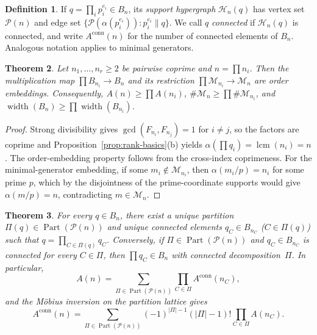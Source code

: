 \documentclass[11pt,letterpaper]{article}
\numberwithin{equation}{section}
\theoremstyle{plain}
\newtheorem{theorem}{Theorem}[section]
\theoremstyle{definition}
\newtheorem{definition}[theorem]{Definition}
\theoremstyle{remark}
\DeclareMathOperator{\lcmop}{lcm}
\DeclareMathOperator{\widthop}{width}
\begin{document}
\begin{definition}\label{def:support-hypergraph}
If $q=\prod_i p_i^{e_i}\in B_n$, its \emph{support hypergraph}
$\mathcal H_n(q)$ has vertex set $\mathcal P(n)$ and edge set
$\{\mathcal P(\alpha(p_i^{e_i})):p_i^{e_i}\parallel q\}$. We call $q$
\emph{connected} if $\mathcal H_n(q)$ is connected, and write
$A^{\mathrm{conn}}(n)$ for the number of connected elements of $B_n$.
Analogous notation applies to minimal generators.
\end{definition}

\begin{theorem}\label{thm:coprime-embedding}
Let $n_1,\dots,n_r\ge 2$ be pairwise coprime and $n=\prod n_i$. Then the
multiplication map $\prod B_{n_i}\to B_n$ and its restriction
$\prod\mathcal M_{n_i}\to\mathcal M_n$ are order embeddings. Consequently,
$A(n)\ge\prod A(n_i)$, $\#\mathcal M_n\ge\prod\#\mathcal M_{n_i}$, and
$\widthop(B_n)\ge\prod\widthop(B_{n_i})$.
\end{theorem}

\begin{proof}
Strong divisibility gives $\gcd(F_{n_i},F_{n_j})=1$ for $i\neq j$, so the
factors are coprime and Proposition~\ref{prop:rank-basics}(b) yields
$\alpha(\prod q_i)=\lcmop(n_i)=n$. The order-embedding property follows from
the cross-index coprimeness. For the minimal-generator embedding, if some
$m_i\notin\mathcal M_{n_i}$, then $\alpha(m_i/p)=n_i$ for some prime
$p$, which by the disjointness of the prime-coordinate supports would give
$\alpha(m/p)=n$, contradicting $m\in\mathcal M_n$.
\end{proof}

\begin{theorem}\label{thm:birth-connected-factorization}
For every $q\in B_n$, there exist a unique partition
$\Pi(q)\in\operatorname{Part}(\mathcal P(n))$ and unique connected elements
$q_C\in B_{n_C}$ ($C\in\Pi(q)$) such that $q=\prod_{C\in\Pi(q)}q_C$.
Conversely, if $\Pi\in\operatorname{Part}(\mathcal P(n))$ and
$q_C\in B_{n_C}$ is connected for every $C\in\Pi$, then
$\prod q_C\in B_n$ with connected decomposition~$\Pi$. In particular,
\begin{equation}\label{eq:partition-formula}
A(n)=\sum_{\Pi\in\operatorname{Part}(\mathcal P(n))}
\prod_{C\in\Pi}A^{\mathrm{conn}}(n_C),
\end{equation}
and the M\"obius inversion on the partition lattice gives
\begin{equation}\label{eq:connected-inversion}
A^{\mathrm{conn}}(n)=\sum_{\Pi\in\operatorname{Part}(\mathcal P(n))}
(-1)^{|\Pi|-1}(|\Pi|-1)!\prod_{C\in\Pi}A(n_C).
\end{equation}
\end{theorem}
\end{document}
